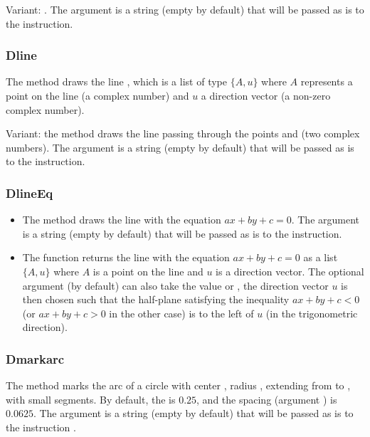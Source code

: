 Variant: . The argument  is a string (empty by default) that will be passed as is to the \drawcmd instruction. \arguScale

\subsubsection{Dline}
The  method draws the line , which is a list of type $\{A,u\}$ where $A$ represents a point on the line (a complex number) and $u$ a direction vector (a non-zero complex number).

Variant: the  method draws the line passing through the points  and  (two complex numbers). The argument  is a string (empty by default) that will be passed as is to the \drawcmd instruction. \arguScale

\subsubsection{DlineEq}
\begin{itemize}
    \item The  method draws the line with the equation \(ax+by+c=0\). The  argument is a string (empty by default) that will be passed as is to the \drawcmd instruction. \arguScale
    
    \item The  function returns the line with the equation \(ax+by+c=0\) as a list $\{A,u\}$ where $A$ is a point on the line and $u$ is a direction vector. The optional argument  (\nil by default) can also take the value  or , the direction vector $u$ is then chosen such that the half-plane satisfying the inequality $ax+by+c<0$ (or $ax+by+c>0$ in the other case) is to the left of $u$ (in the trigonometric direction).
\end{itemize}

\subsubsection{Dmarkarc}
The method  marks the arc of a circle with center , radius , extending from  to , with  small segments. By default, the  is $0.25$, and the spacing (argument ) is $0.0625$. The argument  is a string (empty by default) that will be passed as is to the instruction \drawcmd.

